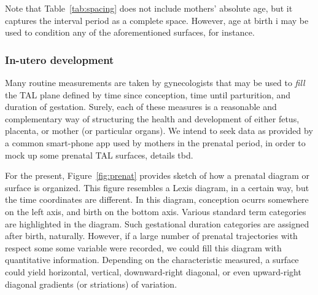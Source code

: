 \documentclass[11pt,oneside]{article} %
\begin{document}
		Note that Table~\ref{tab:spacing} does not include mothers' absolute age, but
		it captures the interval period as a complete space. However, age at birth i
		may be used to condition any of the aforementioned surfaces, for instance.
		
		\subsubsection{In-utero development}
		
		Many routine measurements are taken by gynecologists that may be used to
		\textit{fill} the TAL plane defined by time since conception, time until
		parturition, and duration of gestation. Surely, each of these measures is a reasonable and
		complementary way of structuring the health and development of either fetus,
		placenta, or mother (or particular organs). We intend to seek data as provided
		by a common smart-phone app used by mothers in the prenatal period, in order
		to mock up some prenatal TAL surfaces, details tbd. 
		
		For the present, Figure~\ref{fig:prenat}
		provides sketch of how a prenatal diagram or surface is organized. This figure
		resembles a Lexis diagram, in a certain way, but the time coordinates are
		different. In this diagram, conception ocurrs somewhere on the left axis, and
		birth on the bottom axis. Various standard term categories are highlighted in
		the diagram. Such gestational duration categories are assigned after birth,
		naturally. However, if a large number of prenatal trajectories with
		respect some some variable were recorded, we could fill this diagram with
		quantitative information. Depending on the characteristic measured, a surface
		could yield horizontal, vertical, downward-right diagonal, or even
		upward-right diagonal gradients (or striations) of variation.
				
\end{document}
